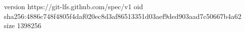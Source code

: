 version https://git-lfs.github.com/spec/v1
oid sha256:4886c748f4805f4daf020ec8d3af86513351d03aef9ded903aad7c50667b4a62
size 1398256
